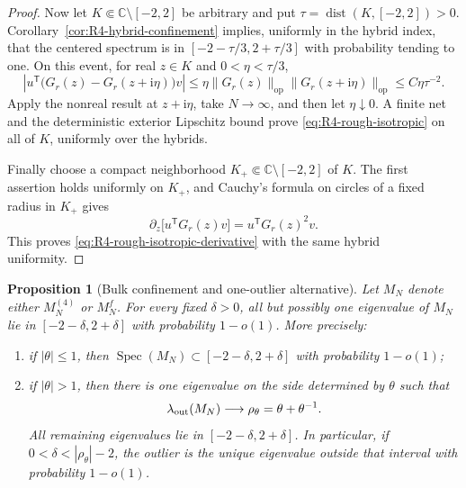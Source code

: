 \documentclass[11pt]{article}
\newtheorem{proposition}[theorem]{Proposition}
\theoremstyle{definition}
\theoremstyle{remark}
\newcommand{\spec}{\operatorname{Spec}}
\newcommand{\ii}{\mathrm i}
\newcommand{\op}{\mathrm{op}}
\newcommand{\norm}[1]{\lVert #1\rVert}
\begin{document}
\begin{proof}
Now let \(K\Subset\mathbb C\setminus[-2,2]\) be arbitrary and put
\(\tau=\operatorname{dist}(K,[-2,2])>0\).
Corollary~\ref{cor:R4-hybrid-confinement}
implies, uniformly in the hybrid index, that the centered spectrum is in
\([-2-\tau/3,2+\tau/3]\) with probability tending to one.  On this event,
for real \(z\in K\) and \(0<\eta<\tau/3\),
\[
 \left|u^{\mathsf T}\bigl(G_r(z)-G_r(z+\ii\eta)\bigr)v\right|
 \le\eta\norm{G_r(z)}_{\op}\norm{G_r(z+\ii\eta)}_{\op}
 \le C\eta\tau^{-2}.
\]
Apply the nonreal result at \(z+\ii\eta\), take \(N\to\infty\), and then
let \(\eta\downarrow0\).  A finite net and the deterministic exterior
Lipschitz bound prove \eqref{eq:R4-rough-isotropic} on all of \(K\), uniformly
over the hybrids.

Finally choose a compact neighborhood
\(K_+\Subset\mathbb C\setminus[-2,2]\) of \(K\).  The first assertion holds
uniformly on \(K_+\), and Cauchy's formula on circles of a fixed radius in
\(K_+\) gives
\[
 \partial_z\bigl[u^{\mathsf T}G_r(z)v\bigr]
 =u^{\mathsf T}G_r(z)^2v.
\]
This proves \eqref{eq:R4-rough-isotropic-derivative} with the same hybrid
uniformity.
\end{proof}

\begin{proposition}[Bulk confinement and one-outlier alternative]
\label{prop:R4-outlier-separation}
Let \(M_N\) denote either \(M_N^{(4)}\) or \(M_N^f\).  For every fixed
\(\delta>0\), all but possibly one eigenvalue of \(M_N\) lie in
\([-2-\delta,2+\delta]\) with probability \(1-o(1)\).  More precisely:
\begin{enumerate}[label=(\roman*)]
\item if \(|\theta|\le1\), then
\(\spec(M_N)\subset[-2-\delta,2+\delta]\) with probability \(1-o(1)\);
\item if \(|\theta|>1\), then there is one eigenvalue on the side determined
by \(\theta\) such that
\begin{equation}\label{eq:R4-outlier-convergence}
 \lambda_{\rm out}(M_N)\longrightarrow
 \rho_\theta=\theta+\theta^{-1}.
\end{equation}
All remaining eigenvalues lie in \([-2-\delta,2+\delta]\).  In particular,
if \(0<\delta<|\rho_\theta|-2\), the outlier is the unique eigenvalue outside
that interval with probability \(1-o(1)\).
\end{enumerate}
\end{proposition}
\end{document}
